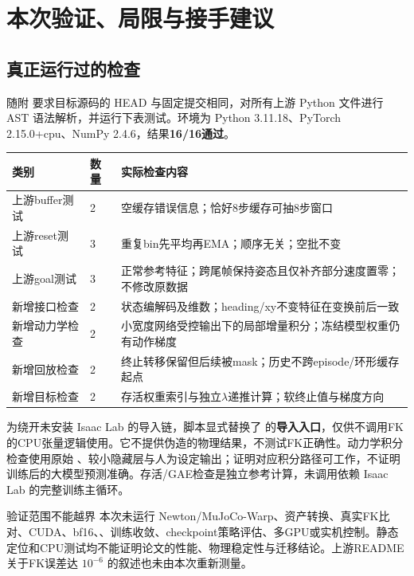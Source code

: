 \section{本次验证、局限与接手建议}\label{sec:verify}
\subsection{真正运行过的检查}
随附  要求目标源码的 HEAD 与固定提交相同，对所有上游 Python 文件进行 AST 语法解析，并运行下表测试。环境为 Python 3.11.18、PyTorch 2.15.0+cpu、NumPy 2.4.6，结果\textbf{16/16通过}。

\noindent\begin{tabularx}{\textwidth}{@{}P{30mm}P{10mm}Y@{}}
\toprule
类别 & 数量 & 实际检查内容\\
\midrule
上游buffer测试 & 2 & 空缓存错误信息；恰好8步缓存可抽8步窗口\\
上游reset测试 & 3 & 重复bin先平均再EMA；顺序无关；空批不变\\
上游goal测试 & 3 & 正常参考特征；跨尾帧保持姿态且仅补齐部分速度置零；不修改原数据\\
新增接口检查 & 2 & 状态编解码及维数；heading/xy不变特征在变换前后一致\\
新增动力学检查 & 2 & 小宽度网络受控输出下的局部增量积分；冻结模型权重仍有动作梯度\\
新增回放检查 & 2 & 终止转移保留但后续被mask；历史不跨episode/环形缓存起点\\
新增目标检查 & 2 & 存活权重索引与独立$\lambda$递推计算；软终止值与梯度方向\\
\bottomrule
\end{tabularx}

为绕开未安装 Isaac Lab 的导入链，脚本显式替换了  的\textbf{导入入口}，仅供不调用FK的CPU张量逻辑使用。它不提供伪造的物理结果，不测试FK正确性。动力学积分检查使用原始 、较小隐藏层与人为设定输出；证明对应积分路径可工作，不证明训练后的大模型预测准确。存活/GAE检查是独立参考计算，未调用依赖 Isaac Lab 的完整训练主循环。

\begin{caution}{验证范围不能越界}
本次未运行 Newton/MuJoCo-Warp、资产转换、真实FK比对、CUDA、bf16、、训练收敛、checkpoint策略评估、多GPU或实机控制。静态定位和CPU测试均不能证明论文的性能、物理稳定性与迁移结论。上游README关于FK误差达 $10^{-6}$ 的叙述也未由本次重新测量。
\end{caution}

